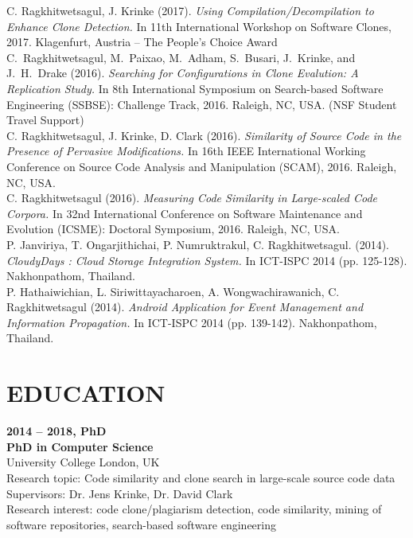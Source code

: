 \documentclass[margin, 10pt]{res} %
\begin{document}
\begin{resume}
C. Ragkhitwetsagul, J. Krinke (2017). \textit{Using Compilation/Decompilation to Enhance Clone Detection.} In 11th International Workshop on Software Clones, 2017. Klagenfurt, Austria -- The People's Choice Award \vspace{2mm} \\
C.~Ragkhitwetsagul, M.~Paixao, M.~Adham, S.~Busari, J.~Krinke, and J.~H.~Drake (2016). \textit{Searching for Configurations in Clone Evalution: A Replication Study.} In 8th International Symposium on Search-based Software Engineering (SSBSE): Challenge Track, 2016. Raleigh, NC, USA. (NSF Student Travel Support) \vspace{2mm} \\
C. Ragkhitwetsagul, J. Krinke, D. Clark (2016). \textit{Similarity of Source Code in the Presence of Pervasive Modifications.} In 16th IEEE International Working Conference on Source Code Analysis and Manipulation (SCAM), 2016. Raleigh, NC, USA. \vspace{2mm} \\
C. Ragkhitwetsagul (2016). \textit{Measuring Code Similarity in Large-scaled Code Corpora.} In 32nd International Conference on Software Maintenance and Evolution (ICSME): Doctoral Symposium, 2016. Raleigh, NC, USA. 
\vspace{2mm} \\
P. Janviriya, T. Ongarjithichai, P. Numruktrakul, C. Ragkhitwetsagul. (2014). \textit{CloudyDays : Cloud Storage Integration System.} In ICT-ISPC 2014 (pp. 125-128). Nakhonpathom, Thailand. 
\vspace{2mm} \\
P. Hathaiwichian, L. Siriwittayacharoen, A. Wongwachirawanich, C. Ragkhitwetsagul (2014). \textit{Android Application for Event Management and Information Propagation.} In ICT-ISPC 2014 (pp. 139-142). Nakhonpathom, Thailand.


\section{EDUCATION}
\textbf{2014 -- 2018, PhD}\\
\textbf{PhD in Computer Science}\\
University College London, UK\\
Research topic:  Code similarity and clone search in large-scale source code data \\
Supervisors: Dr. Jens Krinke, Dr. David Clark\\
Research interest: code clone/plagiarism detection, code similarity, mining of software repositories, search-based software engineering 


\end{resume}
\end{document}
